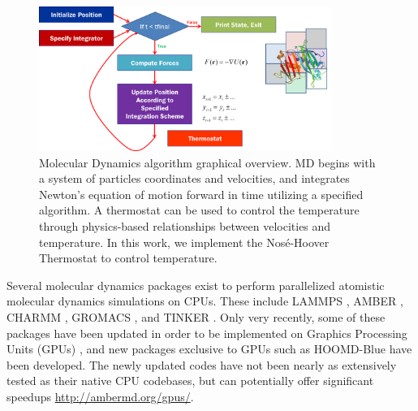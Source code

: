 \begin{figure}
\centering
\includegraphics[width=0.85\textwidth]{mdfigure.png}
\caption{Molecular Dynamics algorithm graphical overview. MD begins with a system of particles coordinates and velocities, and integrates Newton's equation of motion forward in time utilizing a specified algorithm. A thermostat can be used to control the temperature through physics-based relationships between velocities and temperature. In this work, we implement the Nos\'{e}-Hoover Thermostat to control temperature.}
\label{fig:mdfigure}
\end{figure}

Several molecular dynamics packages exist to perform parallelized atomistic molecular dynamics simulations on CPUs.
%
These include LAMMPS \cite{Plimpton1995}, AMBER \cite{Case2010}, CHARMM \cite{MacKerell1998}, GROMACS \cite{Scott1999}, and TINKER \cite{Ponder2003}.
%
Only very recently, some of these packages have been updated in order to be implemented on Graphics Processing Units (GPUs) \cite{Brown2012,Brown2011,Gotz2012,Salomon-Ferrer2013}, and new packages exclusive to GPUs such as HOOMD-Blue\cite{Anderson2008} have been developed. %
The newly updated codes have not been nearly as extensively tested as their native CPU codebases, but can potentially offer significant speedups \url{http://ambermd.org/gpus/}.

